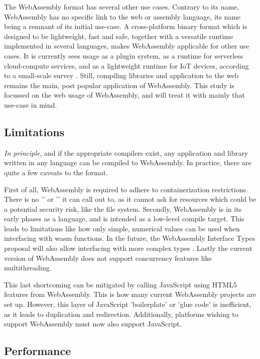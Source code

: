 The WebAssembly format has several other use cases.
Contrary to its name, WebAssembly has no specific link to the web or assembly language, its name being a remnant of its initial use-case.
A cross-platform binary format which is designed to be lightweight, fast and safe, together with a versatile runtime implemented in several languages, makes WebAssembly applicable for other use cases. 
It is currently sees usage as a plugin system, as a runtime for serverless cloud-compute services, and as a lightweight runtime for IoT devices, according to a small-scale survey \citep{eberhardt_state_2022}. 
Still, compiling libraries and application to the web remains the main, post popular application of WebAssembly. 
This study is focussed on the web usage of WebAssembly, and will treat it with mainly that use-case in mind.

\subsection*{Limitations}

\emph{In principle}, and if the appropriate compilers exist, any application and library written in any language can be compiled to WebAssembly. 
In practice, there are quite a few caveats to the format. 

First of all, WebAssembly is required to adhere to containerization restrictions.
There is no '' or '' it can call out to, as it cannot ask for resources which could be a potential security risk, like the file system.
Secondly, WebAssembly is in its early phases as a language, and is intended as a low-level compile target. 
This leads to limitations like how only simple, numerical values can be used when interfacing with \ac{wasm} functions.
In the future, the WebAssembly Interface Types proposal will also allow interfacing with more complex types \citep*{wagner_interface_2022}.
Lastly the current version of WebAssembly does not support concurrency features like multithreading.

This last shortcoming can be mitigated by calling JavaScript using HTML5 features from WebAssembly. 
This is how many current WebAssembly projects are set up. 
However, this layer of JavaScript 'boilerplate' or 'glue code' is inefficient, as it leads to duplication and redirection.
Additionally, platforms wishing to support WebAssembly must now also support JavaScript. 


\subsection*{Performance}

